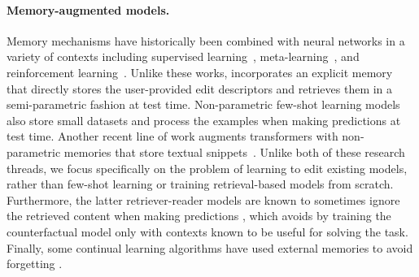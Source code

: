 \documentclass{article}
\begin{document}
\paragraph{Memory-augmented models.} Memory mechanisms have historically been combined with neural networks in a variety of contexts including supervised learning~\citep{hochreiter1997long,graves2008novel,graves2014neural}, meta-learning~\citep{santoro2016memory, shan2020meta}, and reinforcement learning~\citep{oh2016control,pritzel2017neural}. Unlike these works, {\name} incorporates an explicit memory that directly stores the user-provided edit descriptors and retrieves them in a semi-parametric fashion at test time. Non-parametric few-shot learning models~\cite{koch2015siamese,vinyals2016matching,snell2017prototypical} also store small datasets and process the examples when making predictions at test time. Another recent line of work augments transformers with non-parametric memories that store textual snippets~\citep{Chen2017ReadingWT,Lee2019LatentRF,Khandelwal2020GeneralizationTM,karpukhin-etal-2020-dense}. Unlike both of these research threads, we focus specifically on the problem of learning to edit existing models, rather than few-shot learning or training retrieval-based models from scratch. Furthermore, the latter retriever-reader models are known to sometimes ignore the retrieved content when making predictions \citep{lewis2020retrieval,Paranjape2021HindsightPT}, which {\name} avoids by training the counterfactual model only with contexts known to be useful for solving the task. Finally, some continual learning algorithms have used external memories to avoid forgetting \citep{lopez2017gradient,rolnick2019experience,buzzega2020dark}.

\end{document}
